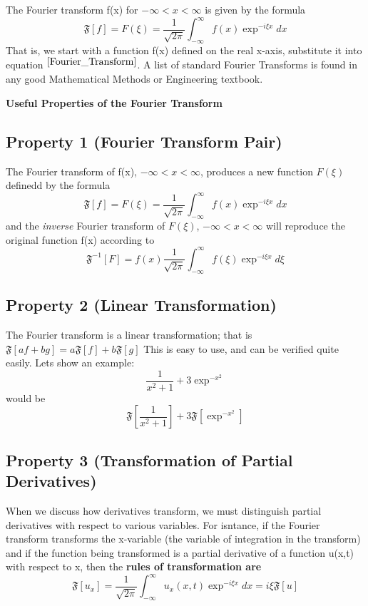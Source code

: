 \documentclass[a4paper,10pt]{article}
\numberwithin{equation}{section}
\numberwithin{figure}{section}
\theoremstyle{plain}
\begin{document}
The Fourier transform f(x) for $-\infty < x < \infty$ is given by the formula
\begin{equation}\label{Fourier_Transform}
 \mathfrak{F}[f] = F(\xi) = \frac{1}{\sqrt{2\pi}}\int_{-\infty}^{\infty} f(x)\exp^{-i\xi x}dx
\end{equation}
That is, we start with a function f(x) defined on the real x-axis, substitute it into equation $^{\ref{Fourier_Transform}}$.
A list of standard Fourier Transforms is found in any good Mathematical Methods or Engineering textbook.
 
\textbf{Useful Properties of the Fourier Transform}
\subsection{Property 1 (Fourier Transform Pair)}
The Fourier transform of f(x), $-\infty < x < \infty$, produces a new function $F(\xi)$ definedd by the 
formula
\begin{displaymath}
 \mathfrak{F}[f] = F(\xi) = \frac{1}{\sqrt{2\pi}}\int_{-\infty}^{\infty} f(x)\exp^{-i\xi x}dx
\end{displaymath}
and the \textit{inverse} Fourier transform of $F(\xi)$, $-\infty < x < \infty$ will reproduce
the original function f(x) according to 
\begin{displaymath}
 \mathfrak{F}^{-1}[F] = f(x) \frac{1}{\sqrt{2\pi}}\int_{-\infty}^{\infty} f(\xi)\exp^{-i\xi x}d\xi
\end{displaymath}
\subsection{Property 2 (Linear Transformation)}
The Fourier transform is a linear transformation; that is 
$\mathfrak{F}[af + bg] = a\mathfrak{F}[f] + b\mathfrak{F}[g]$
This is easy to use, and can be verified quite easily. 
Lets show an example:
\begin{displaymath}
 \frac{1}{x^{2}+1} + 3\exp^{-x^{2}}
\end{displaymath}
would be 
\begin{displaymath}
 \mathfrak{F}\left[\frac{1}{x^{2}+1}\right] + 3\mathfrak{F}\left[\exp^{-x^{2}}\right]
\end{displaymath}
\subsection{Property 3 (Transformation of Partial Derivatives)}
When we discuss how derivatives transform, we must distinguish partial derivatives with respect to
various variables. For isntance, if the Fourier transform transforms the x-variable (the variable of 
integration in the transform) and if the function being transformed is a partial derivative of a function
u(x,t) with respect to x, then the \textbf{rules of transformation are}
\begin{displaymath}
 \mathfrak{F}[u_{x}] = \frac{1}{\sqrt{2\pi}}\int_{-\infty}^{\infty} u_{x}(x,t)\exp^{-i\xi x} dx =
i\xi\mathfrak{F}[u]
\end{displaymath}
 
\end{document}
